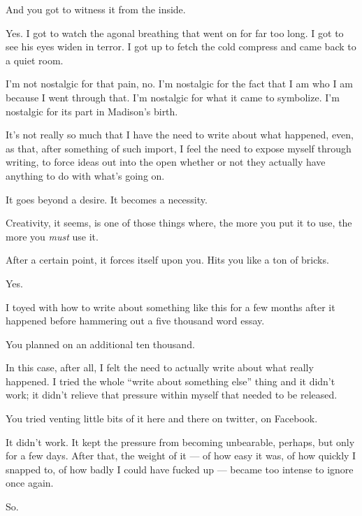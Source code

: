 \begin{paracol}{2}
\begin{leftcolumn}
\begin{ally}
And you got to witness it from the inside.
\end{ally}
Yes. I got to watch the agonal breathing that went on for far too long. I got to see his eyes widen in terror. I got up to fetch the cold compress and came back to a quiet room.

I'm not nostalgic for that pain, no. I'm nostalgic for the fact that I am who I am because I went through that. I'm nostalgic for what it came to symbolize. I'm nostalgic for its part in Madison's birth.
\newpage

\noindent It's not really so much that I have the need to write about what happened, even, as that, after something of such import, I feel the need to expose myself through writing, to force ideas out into the open whether or not they actually have anything to do with what's going on.

\begin{ally}
It goes beyond a desire. It becomes a necessity.
\end{ally}
Creativity, it seems, is one of those things where, the more you put it to use, the more you \emph{must} use it.

\begin{ally}
After a certain point, it forces itself upon you. Hits you like a ton of bricks.
\end{ally}
Yes.

I toyed with how to write about something like this for a few months after it happened before hammering out a five thousand word essay.

\begin{ally}
You planned on an additional ten thousand.
\end{ally}
In this case, after all, I felt the need to actually write about what really happened. I tried the whole ``write about something else'' thing and it didn't work; it didn't relieve that pressure within myself that needed to be released.

\begin{ally}
You tried venting little bits of it here and there on twitter, on Facebook.
\end{ally}
It didn't work. It kept the pressure from becoming unbearable, perhaps, but only for a few days. After that, the weight of it --- of how easy it was, of how quickly I snapped to, of how badly I could have fucked up --- became too intense to ignore once again.

So.


\end{leftcolumn}
\end{paracol}
